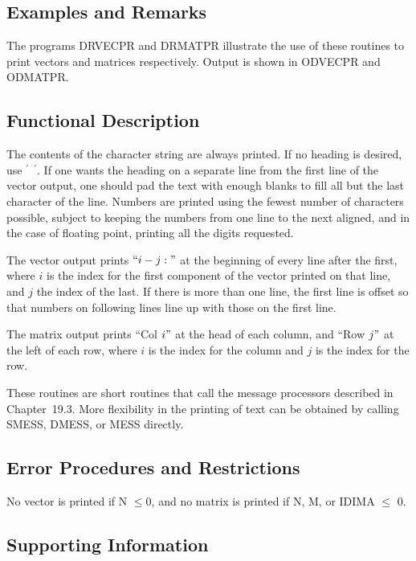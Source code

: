 \documentclass[twoside]{MATH77}
\begin{document}
\subsection{Examples and Remarks}

The programs DRVECPR and DRMATPR illustrate the use of these routines to
print vectors and matrices respectively. Output is shown in ODVECPR and
ODMATPR.

\subsection{Functional Description}

The contents of the character string are always printed. If no
heading is desired,  use $^\prime~~^\prime$. If one wants the heading on
a separate line from the first line of the vector output, one should pad the
text with enough blanks to fill all but the last character of the line.
Numbers are printed using the fewest number of characters possible, subject
to keeping the numbers from one line to the next aligned, and in the case of
floating point, printing all the digits requested.

The vector output prints $``i-j:"$ at the beginning of every line after the
first, where $i$ is the index for the first component of the vector printed
on that line, and $j$ the index of the last.  If there is more than one
line, the first line is offset so that numbers on following lines line
up with those on the first line.

The matrix output prints ``Col $i"$ at the head of each column, and ``Row $j"
$ at the left of each row, where $i$ is the index for the column and $j$ is
the index for the row.

These routines are short routines that call the message processors
described in Chapter~19.3.  More flexibility in the printing of text
can be obtained by calling SMESS, DMESS, or MESS directly.

\subsection{Error Procedures and Restrictions}

No vector is printed if N $\leq 0$, and no matrix is printed if N,
M, or IDIMA $\leq $ 0.

\subsection{Supporting Information}
\end{document}
